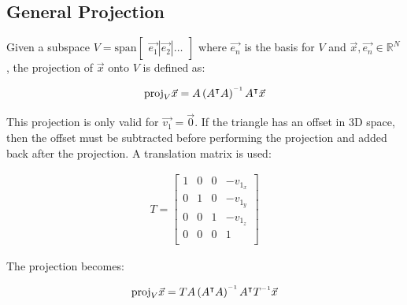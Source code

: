 \subsection{General Projection}

Given a subspace $V = \text{span} \begin{bmatrix} \vec{e_1} | \vec{e_2} | \ldots
\end{bmatrix}$ where $\vec{e_n}$ is the basis for $V$  and  $\vec{x} , \vec{e_n}
\in  \mathbb{R}^N$,  the  projection  of  $\vec{x}$  onto  $V$  is  defined  as:

\begin{align}
    \label{eq:projection_origin}
    \text{proj}_V\vec{x} = A\left(A\transpose A\right)\inverse A\transpose\vec{x}
\end{align}

This projection is only valid for $\vec{v_1} = \vec{0}$.  If the triangle has an
offset in 3D space,  then  the  offset  must be subtracted before performing the
projection and added back after the projection. A translation matrix is used:

\begin{align}
    \label{eq:translate_offset}
    T = \begin{bmatrix}
        1 & 0 & 0 & -v_{1_x} \\
        0 & 1 & 0 & -v_{1_y} \\
        0 & 0 & 1 & -v_{1_z} \\
        0 & 0 & 0 & 1 \\
    \end{bmatrix}
\end{align}

The projection becomes:

\begin{align}
    \label{eq:projection}
    \text{proj}_V\vec{x} = TA\left(A\transpose A\right)\inverse A\transpose T\inverse\vec{x}
\end{align}
